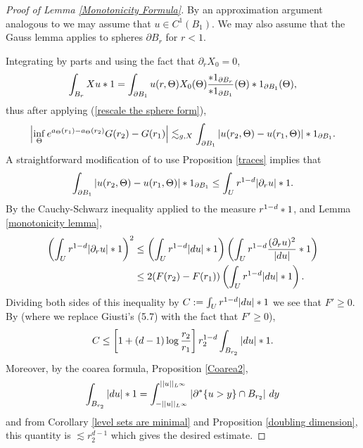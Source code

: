 \begin{proof}[Proof of Lemma \ref{Monotonicity Formula}]
By an approximation argument analogous to \cite[pg68]{Giusti77} we may assume that $u \in C^1(B_1)$.
We may also assume that the Gauss lemma applies to spheres $\partial B_r$ for $r < 1$.

Integrating by parts and using the fact that $\partial_r X_0 = 0$,
$$\int_{B_r} Xu *1 = \int_{\partial B_1} u(r, \Theta) X_0(\Theta) \frac{*1_{\partial B_r}}{*1_{\partial B_1}}(\Theta) *1_{\partial B_1}(\Theta),$$
thus after applying (\ref{rescale the sphere form}),
$$\left|\inf_\Theta e^{a_\Theta(r_1) - a_\Theta(r_2)}G(r_2) - G(r_1)\right| \lesssim_{g, X} \int_{\partial B_1} |u(r_2, \Theta) - u(r_1, \Theta)| *1_{\partial B_1}.$$
A straightforward modification of \cite[Lemma 5.3]{Giusti77} to use Proposition \ref{traces} implies that
$$\int_{\partial B_1} |u(r_2, \Theta) - u(r_1, \Theta)| *1_{\partial B_1} \leq \int_U r^{1 - d} |\partial_r u| *1.$$
By the Cauchy-Schwarz inequality applied to the measure $r^{1-d}*1$, and Lemma \ref{monotonicity lemma},
\begin{align*}
\left(\int_U r^{1 - d} |\partial_r u| *1 \right)^2 &\leq \left(\int_U r^{1 - d}|du|*1\right)\left(\int_U r^{1 - d}\frac{(\partial_ru)^2}{|du|} *1\right)\\
&\leq 2(F(r_2) - F(r_1))\left(\int_U r^{1 - d}|du|*1\right).
\end{align*}
Dividing both sides of this inequality by $C := \int_U r^{1 - d} |du|*1$ we see that $F' \geq 0$.
By \cite[Lemma 5.11]{Giusti77} (where we replace Giusti's (5.7) with the fact that $F' \geq 0$),
$$C \leq \left[1 + (d - 1) \log \frac{r_2}{r_1}\right] r_2^{1 - d} \int_{B_{r_2}} |du| *1.$$
Moreover, by the coarea formula, Proposition \ref{Coarea2},
$$\int_{B_{r_2}} |du| *1 = \int_{-||u||_{L^\infty}}^{||u||_{L^\infty}} |\partial^* \{u > y\} \cap B_{r_2}| ~dy$$
and from Corollary \ref{level sets are minimal} and Proposition \ref{doubling dimension}, this quantity is $\lesssim r_2^{d - 1}$ which gives the desired estimate.
\end{proof}

